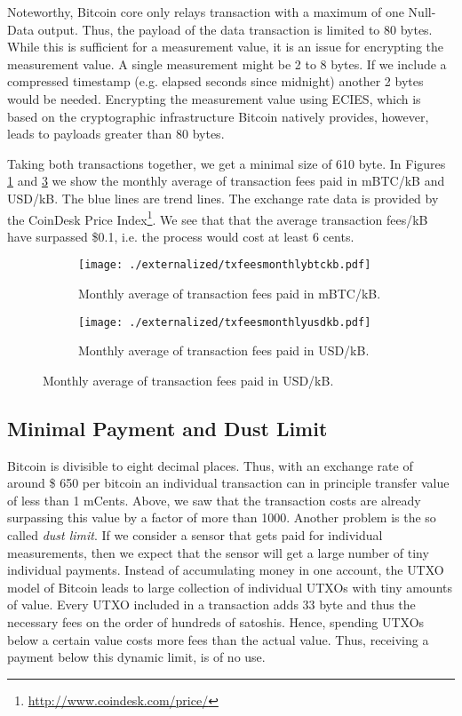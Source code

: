 Noteworthy, Bitcoin core only relays transaction with a maximum of one Null-Data output. Thus, the payload of the data transaction is limited to 80 bytes. While this is sufficient for a measurement value, it is an issue for encrypting the measurement value. A single measurement might be 2 to 8 bytes. If we include a compressed timestamp (e.g. elapsed seconds since midnight) another 2 bytes would be needed. Encrypting the measurement value using \ac{ECIES}, which is based on the cryptographic infrastructure Bitcoin natively provides, however, leads to payloads greater than 80 bytes.

Taking both transactions together, we get a minimal size of 610 byte. In Figures \ref{fig:tx_fees_btc} and \ref{fig:tx_fees_usd} we show the monthly average of transaction fees paid in mBTC/kB and USD/kB. The blue lines are trend lines. The exchange rate data is provided by the CoinDesk Price Index\footnote{\url{http://www.coindesk.com/price/}}. We see that that the average transaction fees/kB have surpassed \$0.1, i.e. the process would cost at least 6 cents.

\begin{figure}[ht]
  \centering
  \begin{subfigure}[t]{0.5\linewidth}
    \centering\texttt{[image: ./externalized/txfeesmonthlybtckb.pdf]}
    \caption{Monthly average of transaction fees paid in mBTC/kB.
    \label{fig:tx_fees_btc}}
  \end{subfigure}%
  \begin{subfigure}[t]{0.5\linewidth}
    \centering\texttt{[image: ./externalized/txfeesmonthlyusdkb.pdf]}
    \caption{Monthly average of transaction fees paid in USD/kB.
    \label{fig:tx_fees_usd}}
  \end{subfigure}
\end{figure}

\subsection{Minimal Payment and Dust Limit}

Bitcoin is divisible to eight decimal places. Thus, with an exchange rate of around \$ 650 per bitcoin an individual transaction can in principle transfer value of less than 1 mCents. Above, we saw that the transaction costs are already surpassing this value by a factor of more than 1000. Another problem is the so called \emph{dust limit}. If we consider a sensor that gets paid for individual measurements, then we expect that the sensor will get a large number of tiny individual payments. Instead of accumulating money in one account, the \ac{UTXO} model of Bitcoin leads to large collection of individual \ac{UTXO}s with tiny amounts of value. Every \ac{UTXO} included in a transaction adds 33 byte and thus the necessary fees on the order of hundreds of satoshis. Hence, spending \ac{UTXO}s below a certain value costs more fees than the actual value. Thus, receiving a payment below this dynamic limit, is of no use.

